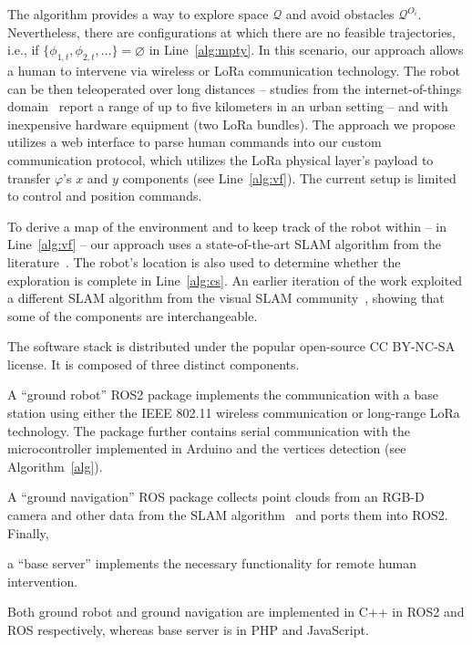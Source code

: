 \documentclass[letterpaper,10pt,conference,twoside]{IEEEtran}
\makeatletter
\theoremstyle{definition}
\newcommand\footnoteref[1]{\protected@xdef\@thefnmark{\ref{#1}}\@footnotemark}
\makeatother
\begin{document}
The %
algorithm provides a way to explore space $\mathcal{Q}$ and avoid obstacles $\mathcal{Q}^{O_i}$. 
Nevertheless, there are configurations at which there are no feasible trajectories, i.e., if $\{\phi_{1,t},\phi_{2,t},\dots\}=\varnothing$ in Line~\ref{alg:mpty}. In this scenario, %
our approach allows a human to intervene via %
wireless or LoRa communication technology. The robot can be then teleoperated over long distances -- studies from the internet-of-things domain~\cite{shanmuga2020survey%
} report a range of up to five kilometers in an urban setting -- and with %
inexpensive hardware equipment (two LoRa bundles). The %
approach we propose utilizes a web interface to parse human commands into our custom communication protocol, which utilizes the LoRa physical layer's payload to transfer $\varphi$'s $x$ and $y$ components (see Line~\ref{alg:vf}). The current setup is limited to control and position commands.

To derive a map of the environment and to keep %
track of the robot within -- in Line~\ref{alg:vf} -- our %
approach uses a state-of-the-art %
SLAM algorithm from the literature~\cite{labbe2019rtab}. The robot's location is also used to determine whether the exploration is complete in Line~\ref{alg:cs}. %
An earlier iteration of the work exploited a different SLAM algorithm from the visual SLAM community~\cite{campos2021orb}, showing that some of the %
components are interchangeable.

The %
software stack 
is distributed under the popular open-source CC BY-NC-SA license\footnoteref{link}. %
It is composed of three distinct components. 
\begin{enumerate*}[label={(\roman*)},font={\textit}]
  \item A ``ground robot'' ROS2 %
package implements the communication with a base station using either the IEEE 802.11 wireless communication or long-range LoRa technology. The package further %
contains serial communication with the microcontroller implemented in Arduino and the vertices detection (see Algorithm~\ref{alg}). 
  \item A ``ground navigation'' ROS package collects point clouds from an RGB-D camera %
and other data from the SLAM algorithm~\cite{labbe2019rtab} and ports them into ROS2. Finally, 
  \item a ``base server'' implements the necessary functionality for remote human intervention.
\end{enumerate*}
Both ground robot and ground navigation are implemented in C++ in ROS2 and ROS respectively, whereas base server is in PHP and JavaScript.
\end{document}

